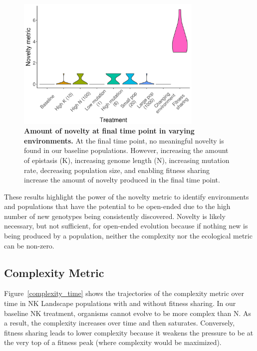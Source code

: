 \documentclass[letterpaper]{article}
\begin{document}
\begin{figure}
\includegraphics[width=3.5in]{figs/noveltyboxplots.png}
\caption{\textbf{Amount of novelty at final time point in varying environments.} At the final time point, no meaningful novelty is found in our baseline populations. However, increasing the amount of epistasis (K), increasing genome length (N), increasing mutation rate, decreasing population size, and enabling fitness sharing increase the amount of novelty produced in the final time point.}
\label{novelty}
\end{figure}

These results highlight the power of the novelty metric to identify environments and populations that have the potential to be open-ended due to the high number of new genotypes being consistently discovered. Novelty is likely necessary, but not sufficient, for open-ended evolution because if nothing new is being produced by a population, neither the complexity nor the ecological metric can be non-zero.

\subsection{Complexity Metric}
Figure~\ref{complexity_time} shows the trajectories of the complexity metric over time in NK Landscape populations with and without fitness sharing. In our baseline NK treatment, organisms cannot evolve to be more complex than N. As a result, the complexity increases over time and then saturates. Conversely, fitness sharing leads to lower complexity because it weakens the pressure to be at the very top of a fitness peak (where complexity would be maximized).
\end{document}
